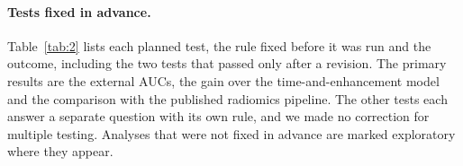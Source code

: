 \paragraph*{Tests fixed in advance.} Table~\ref{tab:2} lists each planned test, the rule fixed before it was run and
the outcome, including the two tests that passed only after a revision. The primary results are the external AUCs,
the gain over the time-and-enhancement model and the comparison with the published radiomics pipeline. The other
tests each answer a separate question with its own rule, and we made no correction for multiple testing. Analyses that
were not fixed in advance are marked exploratory where they appear.

